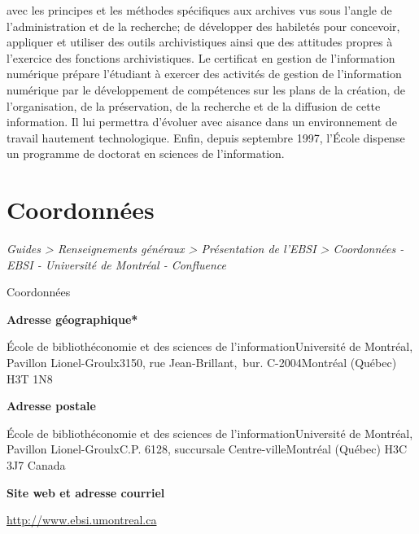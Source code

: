 \documentclass [12 pt]{article}
\begin{document}
                avec les principes et les méthodes spécifiques aux archives vus sous l'angle de
                l'administration et de la recherche; de développer des habiletés pour concevoir,
                appliquer et utiliser des outils archivistiques ainsi que des attitudes propres à
                l'exercice des fonctions archivistiques. Le certificat en gestion de l'information
                numérique prépare l'étudiant à exercer des activités de gestion de l'information
                numérique par le développement de compétences sur les plans de la création, de
                l'organisation, de la préservation, de la recherche et de la diffusion de cette
                information. Il lui permettra d'évoluer avec aisance dans un environnement de
                travail hautement technologique.
            Enfin, depuis septembre 1997, l'École dispense un programme de doctorat en sciences
                de l'information.
        
    
    
        \newpage
        \section {
        Coordonnées
        }
        
        
        
        \textit{
        Guides > Renseignements généraux > Présentation de l'EBSI > Coordonnées
            - EBSI - Université de Montréal - Confluence
        }
    
        Coordonnées
        
            
        \textbf{
        Adresse géographique*
        }
    
            École de bibliothéconomie et des sciences de l'informationUniversité de
                Montréal, Pavillon Lionel-Groulx3150, rue Jean-Brillant, bur.
                C-2004Montréal (Québec) H3T 1N8
            
        \textbf{
        Adresse postale
        }
    
            École de bibliothéconomie et des sciences de l'informationUniversité de
                Montréal, Pavillon Lionel-GroulxC.P. 6128, succursale Centre-villeMontréal
                (Québec) H3C 3J7 Canada
            
        \textbf{
        Site web et adresse courriel
        }
    
            
                
        \href{
        http://www.ebsi.umontreal.ca
        } {
        http://www.ebsi.umontreal.ca
        }
    
\end{document}
